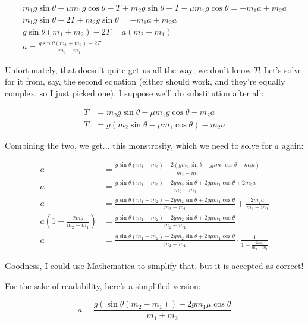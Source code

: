 \documentclass[8.01x]{subfiles}
\begin{document}
\begin{align}
m_1 g \sin \theta + \mu m_1 g \cos \theta - T + m_2 g \sin \theta - T - \mu m_1 g \cos \theta = - m_1 a + m_2 a\\
m_1 g \sin \theta - 2T + m_2 g \sin \theta  = - m_1 a + m_2 a\\
g \sin \theta(m_1 + m_2) - 2T = a(m_2 - m_1)\\
a = \frac{g \sin \theta(m_1 + m_2) - 2T}{m_2 - m_1}
\end{align}

Unfortunately, that doesn't quite get us all the way; we don't know $T$! Let's solve for it from, say, the second equation (either should work, and they're equally complex, so I just picked one). I suppose we'll do substitution after all:

\begin{align}
T &= m_2 g \sin \theta - \mu m_1 g \cos \theta - m_2 a\\
T &= g(m_2 \sin \theta - \mu m_1 \cos \theta) - m_2 a
\end{align}

Combining the two, we get... this monstrosity, which we need to solve for $a$ again:

\begin{align}
a &= \frac{g \sin \theta(m_1 + m_2) - 2(g m_2 \sin \theta - g \mu m_1 \cos \theta - m_2 a)}{m_2 - m_1}\\
a &= \frac{g \sin \theta(m_1 + m_2) - 2g m_2 \sin \theta + 2 g \mu m_1 \cos \theta + 2 m_2 a}{m_2 - m_1}\\
a &= \frac{g \sin \theta(m_1 + m_2) - 2g m_2 \sin \theta + 2 g \mu m_1 \cos \theta}{m_2 - m_1} + \frac{2 m_2 a}{m_2 - m_1}\\
a\left(1 - \frac{2 m_2}{m_2 - m_1}\right) &= \frac{g \sin \theta(m_1 + m_2) - 2g m_2 \sin \theta + 2 g \mu m_1 \cos \theta}{m_2 - m_1}\\
a &= \frac{g \sin \theta(m_1 + m_2) - 2g m_2 \sin \theta + 2 g \mu m_1 \cos \theta}{m_2 - m_1} \cdot \frac{1}{1 - \frac{2 m_2}{m_2 - m_1}}
\end{align}

Goodness, I could use Mathematica to simplify that, but it is accepted as correct!

For the sake of readability, here's a simplified version:

\begin{equation}
a = \frac{g(\sin \theta(m_2 - m_1)) - 2 g m_1 \mu \cos\theta}{m_1 + m_2}
\end{equation}
\end{document}
